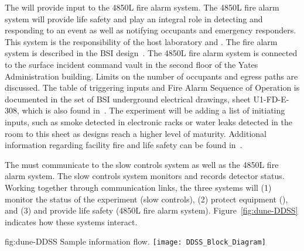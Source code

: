 The  will provide input to the 4850L
fire alarm system.  The 4850L fire alarm system will provide life
safety and play an integral role in detecting and responding to an
event as well as notifying occupants and emergency responders.  This
system is the responsibility of the host laboratory and .  The
fire alarm system is described in the BSI design~\cite{bib:cernedms2093229}.  %
The 4850L fire alarm system is connected to the surface incident command vault in the
second floor of the Yates Administration building. Limits on the
number of occupants and egress paths are discussed. The table of
triggering inputs and Fire Alarm Sequence of Operation is documented
in the set of BSI underground electrical drawings, sheet U1-FD-E-308,
which is also found in~\cite{bib:cernedms2093229}. %
The
experiment will be adding a list of initiating inputs, such as smoke
detected in electronic racks or water leaks detected in the
 room to this sheet as designs reach a higher level of
maturity.  Additional information regarding facility fire and life
safety can be found in~\cite{bib:cernedms2156770}. %

 
The  must communicate to the  slow controls
system as well as the 4850L fire alarm system.  The  slow
controls system monitors and records detector
status.  Working together through communication links, the three
systems will (1) monitor the status of the experiment (slow controls),
(2) protect equipment (),  and (3) and provide life safety (4850L fire alarm system). Figure~\ref{fig:dune-DDSS} indicates how these systems
interact. %
\begin{dunefigure}{fig:dune-DDSS}
  {Sample  information flow.}
  \texttt{[image: DDSS\_Block\_Diagram]}
\end{dunefigure}


